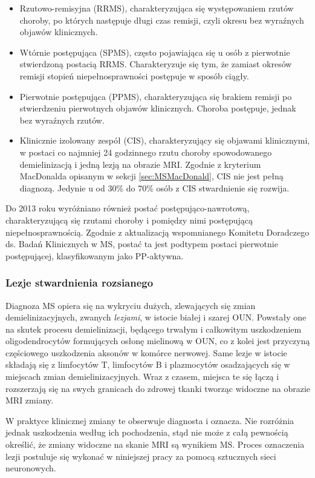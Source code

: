 \begin{itemize}
    \item Rzutowo-remisyjna (RRMS), charakteryzująca się występowaniem rzutów choroby, po których następuje długi czas remisji, czyli okresu bez wyraźnych objawów klinicznych. 
    \item Wtórnie postępująca (SPMS), często pojawiająca się u osób z pierwotnie stwierdzoną postacią RRMS. Charakteryzuje się tym, że zamiast okresów remisji stopień niepełnosprawności postępuje w sposób ciągły.
    \item Pierwotnie postępująca (PPMS), charakteryzująca się brakiem remisji po stwierdzeniu pierwotnych objawów klinicznych. Choroba postępuje, jednak bez wyraźnych rzutów.
    \item Klinicznie izolowany zespół (CIS), charakteryzujący się objawami klinicznymi, w postaci co najmniej 24 godzinnego rzutu choroby spowodowanego demielinizacją i jedną lezją na obrazie MRI. Zgodnie z kryterium MacDonalda opisanym w sekcji \ref{sec:MSMacDonald}, CIS nie jest pełną diagnozą. Jedynie u od 30\% do 70\% osób z CIS stwardnienie się rozwija\cite{Miller2005-ex}.
\end{itemize}
Do 2013 roku wyróżniano również postać postępująco-nawrotową, charakteryzującą się rzutami choroby i pomiędzy nimi postępującą niepełnosprawnością. Zgodnie z aktualizacją wspomnianego Komitetu Doradczego ds. Badań Klinicznych w MS, postać ta jest podtypem postaci pierwotnie postępującej, klasyfikowanym jako PP-aktywna\cite{Lublin2014-md}.

\subsubsection{Lezje stwardnienia rozsianego}
Diagnoza MS opiera się na wykryciu dużych, zlewających się zmian demielinizacyjnych, zwanych \textit{lezjami}, w istocie białej i szarej OUN. Powstały one na skutek procesu demielinizacji, będącego trwałym i całkowitym uszkodzeniem oligodendrocytów formujących osłonę  mielinową w OUN, co z kolei jest przyczyną częściowego uszkodzenia aksonów w komórce nerwowej. Same lezje w istocie składają się z limfocytów T, limfocytów B i plazmocytów osadzających się w miejscach zmian demielinizacyjnych. Wraz z czasem, miejsca te się łączą i rozszerzają się na swych granicach do zdrowej tkanki tworząc widoczne na obrazie MRI zmiany\cite{Lassmann2018-fl}. 
\par 
W praktyce klinicznej zmiany te obserwuje diagnosta i oznacza. Nie rozróżnia jednak uszkodzenia według ich pochodzenia, stąd nie może z całą pewnością określić, że zmiany widoczne na skanie MRI są wynikiem MS. Proces oznaczenia lezji postuluje się wykonać w niniejszej pracy za pomocą sztucznych sieci neuronowych. 


